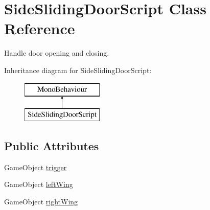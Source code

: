 \hypertarget{class_side_sliding_door_script}{}\section{Side\+Sliding\+Door\+Script Class Reference}
\label{class_side_sliding_door_script}


Handle door opening and closing.  


Inheritance diagram for Side\+Sliding\+Door\+Script\+:\begin{figure}[H]
\begin{center}
\leavevmode
\includegraphics[height=2.000000cm]{class_side_sliding_door_script}
\end{center}
\end{figure}
\subsection*{Public Attributes}
\begin{DoxyCompactItemize}
\item 
Game\+Object \mbox{\hyperlink{class_side_sliding_door_script_ab8c5e23c0073f4f9a906dd6a6aab87cb}{trigger}}
\item 
Game\+Object \mbox{\hyperlink{class_side_sliding_door_script_aafce769f3b7963470a10eceb2c8a269f}{left\+Wing}}
\item 
Game\+Object \mbox{\hyperlink{class_side_sliding_door_script_a02af95e12eaf9a65666ebd05872293ce}{right\+Wing}}
\end{DoxyCompactItemize}
